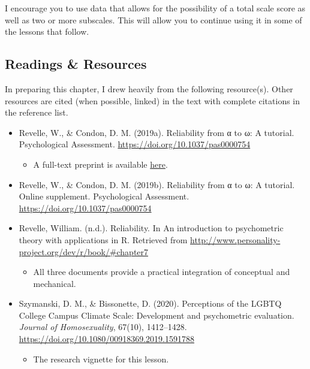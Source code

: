 \documentclass[
  english,
]{book}
\providecommand{\tightlist}{%
  \setlength{\itemsep}{0pt}\setlength{\parskip}{0pt}}
\begin{document}
I encourage you to use data that allows for the possibility of a total scale score as well as two or more subscales. This will allow you to continue using it in some of the lessons that follow.

\hypertarget{readings-resources-3}{%
\subsection{Readings \& Resources}\label{readings-resources-3}}

In preparing this chapter, I drew heavily from the following resource(s). Other resources are cited (when possible, linked) in the text with complete citations in the reference list.

\begin{itemize}
\tightlist
\item
  Revelle, W., \& Condon, D. M. (2019a). Reliability from α to ω: A tutorial. Psychological Assessment. \url{https://doi.org/10.1037/pas0000754}

  \begin{itemize}
  \tightlist
  \item
    A full-text preprint is available \href{https://personality-project.org/revelle/publications/rc.pa.19.pdf}{here}.
  \end{itemize}
\item
  Revelle, W., \& Condon, D. M. (2019b). Reliability from α to ω: A tutorial. Online supplement. Psychological Assessment. \url{https://doi.org/10.1037/pas0000754}
\item
  Revelle, William. (n.d.). Reliability. In An introduction to psychometric theory with applications in R. Retrieved from \url{http://www.personality-project.org/dev/r/book/\#chapter7}

  \begin{itemize}
  \tightlist
  \item
    All three documents provide a practical integration of conceptual and mechanical.
  \end{itemize}
\item
  Szymanski, D. M., \& Bissonette, D. (2020). Perceptions of the LGBTQ College Campus Climate Scale: Development and psychometric evaluation. \emph{Journal of Homosexuality}, 67(10), 1412--1428. \url{https://doi.org/10.1080/00918369.2019.1591788}

  \begin{itemize}
  \tightlist
  \item
    The research vignette for this lesson.
  \end{itemize}
\end{itemize}
\end{document}
